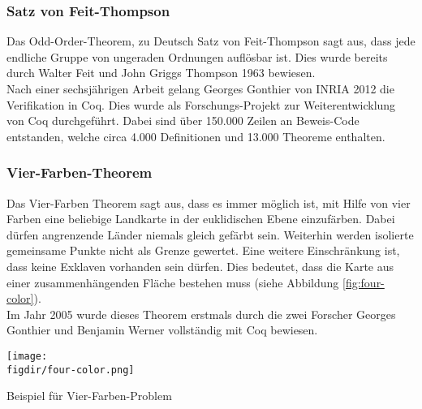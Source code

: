 \subsubsection{Satz von Feit-Thompson}
Das Odd-Order-Theorem, zu Deutsch Satz von Feit-Thompson sagt aus, dass jede endliche Gruppe von ungeraden Ordnungen auflösbar ist. Dies wurde bereits durch Walter Feit und John Griggs Thompson 1963 bewiesen.\cite{ODD01:FV}\\
Nach einer sechsjährigen Arbeit gelang Georges Gonthier von INRIA 2012 die Verifikation in Coq. Dies wurde als Forschungs-Projekt zur Weiterentwicklung von Coq durchgeführt. Dabei sind über 150.000 Zeilen an Beweis-Code entstanden, welche circa 4.000 Definitionen und 13.000 Theoreme enthalten.\cite{ODD01:FV}

\subsubsection{Vier-Farben-Theorem}
Das Vier-Farben Theorem sagt aus, dass es immer möglich ist, mit Hilfe von vier Farben eine beliebige Landkarte in der euklidischen Ebene einzufärben. Dabei dürfen angrenzende Länder niemals gleich gefärbt sein. Weiterhin werden isolierte gemeinsame Punkte nicht als Grenze gewertet. Eine weitere Einschränkung ist, dass keine Exklaven vorhanden sein dürfen. Dies bedeutet, dass die Karte aus einer zusammenhängenden Fläche bestehen muss (siehe Abbildung \ref{fig:four-color}).\cite{FOURCOLORS01:FV}\\
Im Jahr 2005 wurde dieses Theorem erstmals durch die zwei Forscher Georges Gonthier und Benjamin Werner vollständig mit Coq bewiesen.
\cite{FOURCOLORS02:FV}\\

\begin{minipage}{\textwidth}
	\centering
	\captionsetup{type=figure}
	\texttt{[image: \\figdir/four-color.png]}
	\caption{Beispiel für Vier-Farben-Problem}
	\label{fig:four-color}
\end{minipage}

